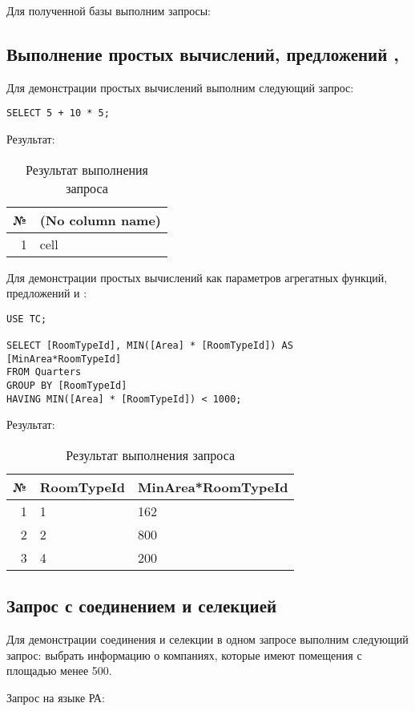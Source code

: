 \documentclass[a4paper,14pt]{extarticle}
\begin{document}
Для полученной базы выполним запросы:
\subsection{Выполнение простых вычислений, предложений , }
Для демонстрации простых вычислений выполним следующий запрос:
\begin{lstlisting}
SELECT 5 + 10 * 5;
\end{lstlisting}

Результат:
\begin{table}[H]
    \caption{Результат выполнения запроса}
    \noindent\begin{tabular}{|r|l|}
        \hline
        № & (No column name) \\ \hline
        1 & cell \\
        \hline
    \end{tabular}
\end{table}

Для демонстрации простых вычислений как параметров агрегатных функций,
предложений  и :
\begin{lstlisting}
USE TC;

SELECT [RoomTypeId], MIN([Area] * [RoomTypeId]) AS [MinArea*RoomTypeId]
FROM Quarters
GROUP BY [RoomTypeId]
HAVING MIN([Area] * [RoomTypeId]) < 1000;
\end{lstlisting}

Результат:
\begin{table}[H]
    \caption{Результат выполнения запроса}
    \noindent\begin{tabular}{|r|l|l|}
        \hline
        № & RoomTypeId & MinArea*RoomTypeId \\ \hline
        1 & 1 & 162 \\ \hline
        2 & 2 & 800 \\ \hline
        3 & 4 & 200 \\ \hline
    \end{tabular}
\end{table}

\subsection{Запрос с соединением и селекцией}
Для демонстрации соединения и селекции в одном запросе выполним следующий
запрос: выбрать информацию о компаниях, которые имеют помещения с площадью
менее 500.

Запрос на языке РА:
\end{document}
